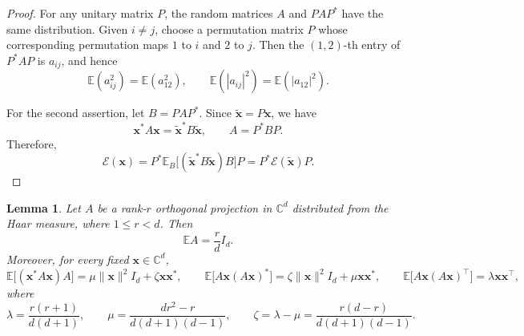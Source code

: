 \documentclass{article}
\newcommand{\C}{{\mathbb C}}
\newcommand{\E}{{\mathbb E}}
\newcommand{\vx}{{\mathbf x}}
\newcommand{\0}{{\mathbf 0}}
\newtheorem{lemma}[theorem]{Lemma}
\numberwithin{equation}{section}
\begin{document}
	\begin{proof}
		For any unitary matrix $P$, the random matrices $A$ and $PAP^*$ have the same distribution. Given $i\ne j$, choose a permutation matrix $P$ whose corresponding permutation maps $1$ to $i$ and $2$ to $j$. Then the $(1,2)$-th entry of $P^*AP$ is $a_{ij}$, and hence
		\[
		\E(a_{ij}^2)=\E(a_{12}^2),\qquad \E(|a_{ij}|^2)=\E(|a_{12}|^2).
		\]
		
		For the second assertion, let $B=PAP^*$. Since $\widetilde{\vx}=P\vx$, we have
		\[
		\vx^*A\vx=\widetilde{\vx}^*B\widetilde{\vx},\qquad A=P^*BP.
		\]
		Therefore,
		\[
		\mathcal E(\vx)=P^*\E_B\big[(\widetilde{\vx}^*B\widetilde{\vx})B\big]P=P^*\mathcal E(\widetilde{\vx})P.
		\]
	\end{proof}
	
	
	\begin{lemma}
		\label{lem:expectations}
		Let $A$ be a rank-$r$ orthogonal projection in $\C^d$ distributed from the Haar measure, where $1\le r<d$. Then
		\[
		\E A=\frac rd I_d.
		\]
		Moreover, for every fixed $\vx\in\C^d$,
		\[
		\E\big[(\vx^*A\vx)A\big]=\mu\|\vx\|^2I_d+\zeta\vx\vx^*,\qquad\E\big[A\vx(A\vx)^*\big]=\zeta\|\vx\|^2I_d+\mu\vx\vx^*,\qquad\E\big[A\vx(A\vx)^\top\big]=\lambda\vx\vx^\top,
		\]
		where
		\begin{equation}\label{defi_para}
			\lambda=\frac{r(r+1)}{d(d+1)},\qquad
			\mu=\frac{dr^2-r}{d(d+1)(d-1)},\qquad
			\zeta=\lambda-\mu=\frac{r(d-r)}{d(d+1)(d-1)}.
		\end{equation}
	\end{lemma}
	
\end{document}
